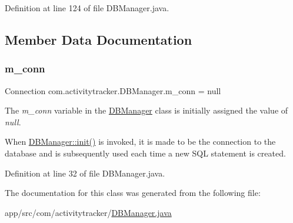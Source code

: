 Definition at line 124 of file D\+B\+Manager.\+java.



\subsection{Member Data Documentation}
\mbox{\label{classcom_1_1activitytracker_1_1_d_b_manager_a064088d13ac09eb147fdc19268771521}} 
\subsubsection{\texorpdfstring{m\+\_\+conn}{m\_conn}}
{\footnotesize\ttfamily Connection com.\+activitytracker.\+D\+B\+Manager.\+m\+\_\+conn = null\hspace{0.3cm}{\ttfamily [private]}}

The {\itshape m\+\_\+conn} variable in the \mbox{\hyperlink{classcom_1_1activitytracker_1_1_d_b_manager}{D\+B\+Manager}} class is initially assigned the value of {\itshape null}.

When \mbox{\hyperlink{classcom_1_1activitytracker_1_1_d_b_manager_a41df4600bb5901a26a4ea6a7108a70b9}{D\+B\+Manager\+::init()}} is invoked, it is made to be the connection to the database and is subsequently used each time a new S\+QL statement is created. 

Definition at line 32 of file D\+B\+Manager.\+java.



The documentation for this class was generated from the following file\+:\begin{DoxyCompactItemize}
\item 
app/src/com/activitytracker/\mbox{\hyperlink{_d_b_manager_8java}{D\+B\+Manager.\+java}}\end{DoxyCompactItemize}
